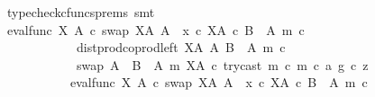 \begin{isabellebody}
\ {\isacharparenleft}{\kern0pt}typecheck{\isacharunderscore}{\kern0pt}cfuncs{\isacharunderscore}{\kern0pt}prems{\isacharcomma}{\kern0pt}\ smt{\isacharparenright}{\kern0pt}\isanewline
\ \ \ \ \ \ \ \ \ \ \isamarkupfalse%
\ \isamarkupfalse%
\ {\isachardoublequoteopen}{\isacharparenleft}{\kern0pt}eval{\isacharunderscore}{\kern0pt}func\ X\ A\ {\isasymcirc}\isactrlsub c\ swap\ {\isacharparenleft}{\kern0pt}X\isactrlbsup A\isactrlesup {\isacharparenright}{\kern0pt}\ A{\isacharparenright}{\kern0pt}\ {\isasymamalg}\ {\isacharparenleft}{\kern0pt}x\ {\isasymcirc}\isactrlsub c\ {\isasymbeta}\isactrlbsub X\isactrlbsup A\isactrlesup \ {\isasymtimes}\isactrlsub c\ {\isacharparenleft}{\kern0pt}B\ {\isasymsetminus}\ {\isacharparenleft}{\kern0pt}A{\isacharcomma}{\kern0pt}\ m{\isacharparenright}{\kern0pt}{\isacharparenright}{\kern0pt}\isactrlesub {\isacharparenright}{\kern0pt}\ {\isasymcirc}\isactrlsub c\isanewline
\ \ \ \ \ \ \ \ \ \ \ \ dist{\isacharunderscore}{\kern0pt}prod{\isacharunderscore}{\kern0pt}coprod{\isacharunderscore}{\kern0pt}left\ {\isacharparenleft}{\kern0pt}X\isactrlbsup A\isactrlesup {\isacharparenright}{\kern0pt}\ A\ {\isacharparenleft}{\kern0pt}B\ {\isasymsetminus}\ {\isacharparenleft}{\kern0pt}A{\isacharcomma}{\kern0pt}\ m{\isacharparenright}{\kern0pt}{\isacharparenright}{\kern0pt}\ {\isasymcirc}\isactrlsub c\isanewline
\ \ \ \ \ \ \ \ \ \ \ \ swap\ {\isacharparenleft}{\kern0pt}A\ {\isasymCoprod}\ {\isacharparenleft}{\kern0pt}B\ {\isasymsetminus}\ {\isacharparenleft}{\kern0pt}A{\isacharcomma}{\kern0pt}\ m{\isacharparenright}{\kern0pt}{\isacharparenright}{\kern0pt}{\isacharparenright}{\kern0pt}\ {\isacharparenleft}{\kern0pt}X\isactrlbsup A\isactrlesup {\isacharparenright}{\kern0pt}\ {\isasymcirc}\isactrlsub c\ {\isasymlangle}{\isacharparenleft}{\kern0pt}try{\isacharunderscore}{\kern0pt}cast\ m\ {\isasymcirc}\isactrlsub c\ m{\isacharparenright}{\kern0pt}\ {\isasymcirc}\isactrlsub c\ a{\isacharcomma}{\kern0pt}\ g\ {\isasymcirc}\isactrlsub c\ z{\isasymrangle}\isanewline
\ \ \ \ \ \ \ \ \ \ {\isacharequal}{\kern0pt}\ {\isacharparenleft}{\kern0pt}eval{\isacharunderscore}{\kern0pt}func\ X\ A\ {\isasymcirc}\isactrlsub c\ swap\ {\isacharparenleft}{\kern0pt}X\isactrlbsup A\isactrlesup {\isacharparenright}{\kern0pt}\ A{\isacharparenright}{\kern0pt}\ {\isasymamalg}\ {\isacharparenleft}{\kern0pt}x\ {\isasymcirc}\isactrlsub c\ {\isasymbeta}\isactrlbsub X\isactrlbsup A\isactrlesup \ {\isasymtimes}\isactrlsub c\ {\isacharparenleft}{\kern0pt}B\ {\isasymsetminus}\ {\isacharparenleft}{\kern0pt}A{\isacharcomma}{\kern0pt}\ m{\isacharparenright}{\kern0pt}{\isacharparenright}{\kern0pt}\isactrlesub {\isacharparenright}{\kern0pt}\ {\isasymcirc}\isactrlsub c\isanewline

\end{isabellebody}
